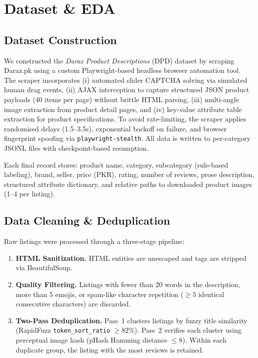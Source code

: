 \documentclass[12pt,a4paper]{article}
\begin{document}
\section{Dataset \& EDA}

\subsection{Dataset Construction}

We constructed the \emph{Daraz Product Descriptions} (DPD) dataset by scraping
Daraz.pk using a custom Playwright-based headless browser automation tool. The scraper
incorporates (i) automated slider CAPTCHA solving via simulated human drag events,
(ii) AJAX interception to capture structured JSON product payloads (40 items per page)
without brittle HTML parsing, (iii) multi-angle image extraction from product detail
pages, and (iv) key-value attribute table extraction for product specifications.
To avoid rate-limiting, the scraper applies randomised delays (1.5--3.5s), exponential
backoff on failure, and browser fingerprint spoofing via \texttt{playwright-stealth}.
All data is written to per-category JSONL files with checkpoint-based resumption.

Each final record stores: product name, category, subcategory (rule-based labeling),
brand, seller, price (PKR), rating, number of reviews, prose description, structured
attribute dictionary, and relative paths to downloaded product images (1--4 per listing).

\subsection{Data Cleaning \& Deduplication}

Raw listings were processed through a three-stage pipeline:

\begin{enumerate}[noitemsep]
  \item \textbf{HTML Sanitization.} HTML entities are unescaped and tags are stripped
        via BeautifulSoup.
  \item \textbf{Quality Filtering.} Listings with fewer than 20 words in the description,
        more than 5 emojis, or spam-like character repetition ($\geq 5$ identical consecutive
        characters) are discarded.
  \item \textbf{Two-Pass Deduplication.} Pass~1 clusters listings by fuzzy title
        similarity (RapidFuzz \texttt{token\_sort\_ratio} $\geq 82\%$). Pass~2 verifies
        each cluster using perceptual image hash (pHash Hamming distance $\leq 8$).
        Within each duplicate group, the listing with the most reviews is retained.
\end{enumerate}
\end{document}
